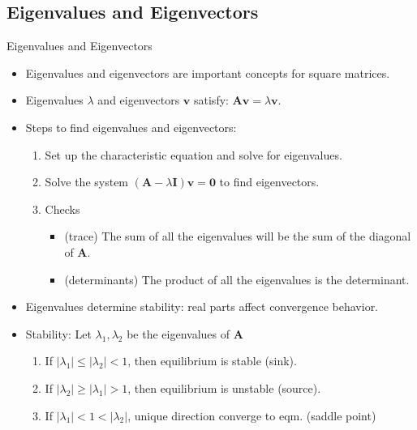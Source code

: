 \documentclass[
10pt, %
]{beamer}
\begin{document}
\subsection{Eigenvalues and Eigenvectors}
\begin{frame}{Eigenvalues and Eigenvectors}
  \begin{itemize}
    \item Eigenvalues and eigenvectors are important concepts for square matrices.
    \item Eigenvalues \(\lambda\) and eigenvectors \(\mathbf{v}\) satisfy: \(\mathbf{A}\mathbf{v} = \lambda\mathbf{v}\).
    \item Steps to find eigenvalues and eigenvectors:
    \begin{enumerate}
      \item Set up the characteristic equation and solve for eigenvalues.
      \item Solve the system \((\mathbf{A} - \lambda\mathbf{I})\mathbf{v} = \mathbf{0}\) to find eigenvectors.
      \item Checks
      \begin{itemize}
        \item (trace) The sum of all the eigenvalues will be the sum of the diagonal of $\mathbf{A}$.
        \item (determinants) The product of all the eigenvalues is the determinant.
      \end{itemize}
    \end{enumerate}
    \item Eigenvalues determine stability: real parts affect convergence behavior.
    \item Stability: Let $\lambda_1, \lambda_2$ be the eigenvalues of $\mathbf{A}$
    \begin{enumerate}
    	\item If $|\lambda_1| \leq |\lambda_2| < 1$, then equilibrium is stable (sink).
    	\item If $|\lambda_2| \geq |\lambda_1| > 1$, then equilibrium is unstable (source).
    	\item If $|\lambda_1| < 1 < |\lambda_2| $, unique direction converge to eqm. (saddle point)
    \end{enumerate}
  \end{itemize}
\end{frame}
\end{document}
